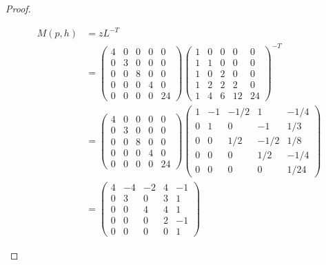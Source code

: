 \documentclass[12pt]{extarticle}
\newcommand{\<}{\langle}
\renewcommand{\>}{\rangle}
\theoremstyle{definition}
\begin{document}
\begin{proof}
\begin{enumerate}
    \begin{align*}
      M(p,h)
      &=
      zL^{-T} \\
      &=
      \begin{pmatrix}
        4 & 0 & 0 & 0 & 0 \\
        0 & 3 & 0 & 0 & 0 \\
        0 & 0 & 8 & 0 & 0 \\
        0 & 0 & 0 & 4 & 0 \\
        0 & 0 & 0 & 0 & 24
      \end{pmatrix}
      \begin{pmatrix}
        1 & 0 & 0 & 0 & 0 \\
        1 & 1 & 0 & 0 & 0 \\
        1 & 0 & 2 & 0 & 0 \\
        1 & 2 & 2 & 2 & 0 \\
        1 & 4 & 6 & 12 & 24
      \end{pmatrix}^{-T} \\
      &=
      \begin{pmatrix}
        4 & 0 & 0 & 0 & 0 \\
        0 & 3 & 0 & 0 & 0 \\
        0 & 0 & 8 & 0 & 0 \\
        0 & 0 & 0 & 4 & 0 \\
        0 & 0 & 0 & 0 & 24
      \end{pmatrix}      
      \begin{pmatrix}
        1 & -1 & -1/2 &    1 & -1/4 \\
        0 &  1 &    0 &   -1 &  1/3 \\
        0 &  0 &  1/2 & -1/2 &  1/8 \\
        0 &  0 &    0 &  1/2 & -1/4 \\
        0 &  0 &    0 &    0 & 1/24 
      \end{pmatrix} \\
      &=
      \begin{pmatrix}
        4 & -4 & -2 & 4 & -1 \\
        0 &  3 &  0 & 3 &  1 \\
        0 &  0 &  4 & 4 &  1 \\
        0 &  0 &  0 & 2 & -1 \\
        0 &  0 &  0 & 0 &  1 
      \end{pmatrix}
    \end{align*}
    
  \end{enumerate}
\end{proof}
\end{document}
